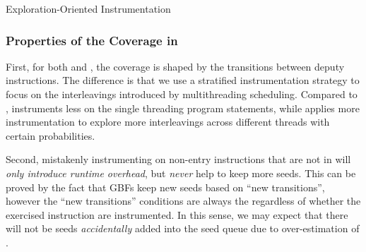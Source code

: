 \begin{algorithm}[t]
\caption{Exploration-Oriented Instrumentation}\label{algo:inst_explore}
\end{algorithm}

\subsubsection{Properties of the Coverage in \MTIns}

First, for both \AFLIns and \MTIns, the coverage is shaped by the transitions between deputy instructions. The difference is that we use a stratified instrumentation strategy to focus on the interleavings introduced by multithreading scheduling. Compared to \AFLIns, \MTIns instruments less on the single threading program statements, while applies more instrumentation to explore more interleavings across different threads with certain probabilities.

Second, mistakenly instrumenting on non-entry instructions that are not in \mtiscope will \emph{only introduce runtime overhead}, but \emph{never} help to keep more seeds.
This can be proved by the fact that GBFs keep new seeds based on ``new transitions'', however the ``new transitions'' conditions are always the regardless of whether the exercised instruction are instrumented. 
In this sense, we may expect that there will not be seeds \emph{accidentally} added into the seed queue due to over-estimation of \mtiscope. 

